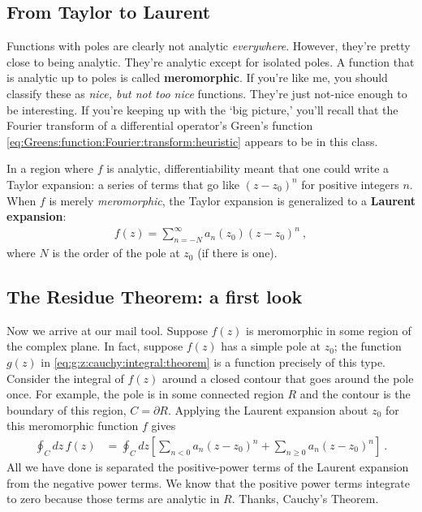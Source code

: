 \subsection{From Taylor to Laurent}

Functions with poles are clearly not analytic \emph{everywhere}. However, they're pretty close to being analytic. They're analytic except for isolated poles. A function that is analytic up to poles is called \textbf{meromorphic}. If you're like me, you should classify these as \emph{nice, but not too nice} functions. They're just not-nice enough to be interesting. If you're keeping up with the `big picture,' you'll recall that the Fourier transform of a differential operator's Green's function  \eqref{eq:Greens:function:Fourier:transform:heuristic} appears to be in this class.

In a region where $f$ is analytic, differentiability meant that one could write a Taylor expansion: a series of terms that go like $(z-z_0)^n$ for positive integers $n$. When $f$ is merely \emph{meromorphic}, the Taylor expansion is generalized to a \textbf{Laurent expansion}:
\begin{align}
	f(z) = \sum_{n=-N}^\infty  a_n(z_0) (z-z_0)^n \ ,
\end{align}
where $N$ is the order of the pole at $z_0$ (if there is one). 

\subsection{The Residue Theorem: a first look}

Now we arrive at our mail tool. Suppose $f(z)$ is meromorphic in some region of the complex plane. In fact, suppose $f(z)$ has a simple pole at $z_0$; the function $g(z)$ in \eqref{eq:g:z:cauchy:integral:theorem} is a function precisely of this type. Consider the integral of $f(z)$ around a closed contour that goes around the pole once. For example, the pole is in some connected region $R$ and the contour is the boundary of this region, $C=\partial R$. Applying the Laurent expansion about $z_0$ for this meromorphic function $f$ gives
\begin{align}
	\oint_C dz\, f(z) &= \oint_C dz 
	\left[
	\sum_{n<0} a_n (z-z_0)^n + \sum_{n\geq 0} a_n (z-z_0)^n
	\right] \ .
\end{align}
All we have done is separated the positive-power terms of the Laurent expansion from the negative power terms. We know that the positive power terms integrate to zero because those terms are analytic in $R$. Thanks, Cauchy's Theorem.

